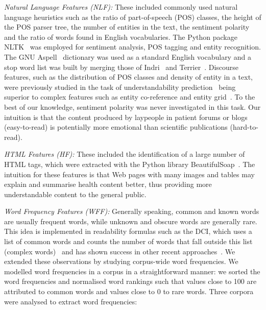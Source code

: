 \textit{Natural Language Features (NLF):}
These included commonly used natural language heuristics such as the ratio of part-of-speech (POS) classes, the height of the POS parser tree, the number of entities in the text, 
the sentiment polarity and the ratio of words found in English vocabularies. The Python package NLTK~\cite{nltk} was employed for sentiment analysis, POS tagging and entity recognition. The GNU Aspell~\cite{aspell} dictionary was used as a standard English vocabulary and a stop word list was built by merging those of Indri~\cite{indri} and Terrier~\cite{terrier}. 
Discourse features, such as the distribution of POS classes and density of entity in a text, were previously studied in the task of understandability prediction~\cite{feng10} being superior to complex features such as entity co-reference and entity grid~\cite{barzilay08}. To the best of our knowledge, sentiment polarity was never investigated in this task. Our intuition is that the content produced by laypeople in patient forums or blogs (easy-to-read) is potentially more emotional than scientific publications (hard-to-read).

\textit{HTML Features (HF):}
These included the identification of a large number of HTML tags, which were extracted with the Python library BeautifulSoap~\cite{bs4}. The intuition for these features is that Web pages with many images and tables may explain and summarise health content better, thus providing more understandable content to the general public. 

\textit{Word Frequency Features (WFF):}
Generally speaking, common and known words are usually frequent words, while unknown and obscure words are generally rare. This idea  is implemented in readability formulas such as the DCI, which uses a list of common words and counts the number of words that fall outside this list (complex words)~\cite{dale48} and has shown success in other recent approaches~\cite{elhadad06,wu15}.
We extended these observations by studying corpus-wide word frequencies. 
We modelled word frequencies in a corpus in a straightforward manner: we sorted the word frequencies and normalised word rankings such that values close to 100 are attributed to common words and values close to 0 to rare words. Three corpora were analysed to extract word frequencies:

